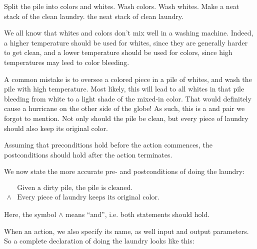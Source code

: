 \begin{codebox}
\li Split the pile into colors and whites.
\li Wash colors.
\li Wash whites.
\li Make a neat stack of the clean laundry.
\li \Return the neat stack of clean laundry.
\end{codebox}

We all know that whites and colors don't mix well in a washing machine. Indeed,
a higher temperature should be used for whites, since they are generally harder
to get clean, and a lower temperature should be used for colors, since high
temperatures may leed to color bleeding.

A common mistake is to oversee a colored piece in a pile of whites, and wash
the pile with high temperature.  Most likely, this will lead to all whites in
that pile bleeding from white to a light shade of the mixed-in color. That
would definitely cause a hurricane on the other side of the globe!  As such,
this is a  and  pair we forgot to mention. Not
only should the pile be clean, but every piece of laundry should also keep its
original color.

\begin{definition}

Assuming that preconditions hold before the action commences, the
postconditions should hold after the action terminates\footnotemark.


\end{definition}

We now state the more accurate pre- and postconditions of doing the laundry:

\begin{codebox}
\zi
$\begin{array}{ll}
&\text{Given a dirty pile, the pile is cleaned.}\\
\wedge&\text{Every piece of laundry keeps its original color.}
\end{array}$
\end{codebox}

Here, the symbol $\wedge$ means ``and'', i.e. both statements should hold.

When  an action, we also specify its name, as well input and
output parameters. So a complete declaration of doing the laundry looks like
this:

